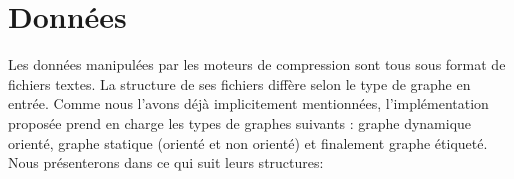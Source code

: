 	
%	
 
	
	\section{Données}
	Les données manipulées par les moteurs de compression sont tous sous format de fichiers textes. La structure de ses fichiers diffère selon le type de graphe en entrée. Comme nous l'avons déjà implicitement mentionnées, l'implémentation proposée prend en charge les types de graphes suivants : graphe dynamique orienté, graphe statique (orienté et non orienté) et finalement graphe étiqueté. Nous présenterons dans ce qui suit leurs structures:
	
